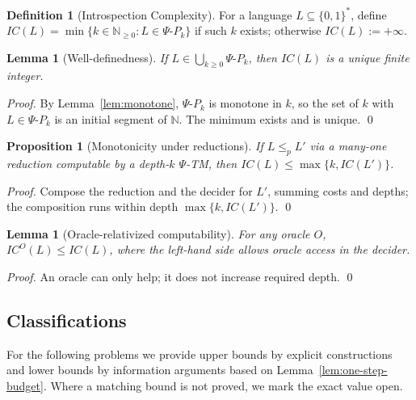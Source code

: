\documentclass[11pt]{article}
\newtheorem{lemma}[theorem]{Lemma}
\newtheorem{proposition}[theorem]{Proposition}
\theoremstyle{definition}
\newtheorem{definition}[theorem]{Definition}
\newcommand{\PSi}{\Psi}
\newcommand{\bits}{\{0,1\}}
\begin{document}
\begin{definition}[Introspection Complexity]
For a language $L\subseteq \bits^*$, define $IC(L)=\min\{k\in\mathbb{N}_{\ge0}: L\in \Psi\text{-}P_k\}$ if such $k$ exists; otherwise $IC(L):=+\infty$.
\end{definition}

\begin{lemma}[Well-definedness]
If $L\in\bigcup_{k\ge0} \Psi\text{-}P_k$, then $IC(L)$ is a unique finite integer.
\end{lemma}
\begin{proof}
By Lemma~\ref{lem:monotone}, $\Psi\text{-}P_k$ is monotone in $k$, so the set of $k$ with $L\in\Psi\text{-}P_k$ is an initial segment of $\mathbb{N}$. The minimum exists and is unique. \qed
\end{proof}

\begin{proposition}[Monotonicity under reductions]
If $L\le_p L'$ via a many-one reduction computable by a depth-$k$ $\PSi$-TM, then $IC(L)\le \max\{k, IC(L')\}$.
\end{proposition}
\begin{proof}
Compose the reduction and the decider for $L'$, summing costs and depths; the composition runs within depth $\max\{k,IC(L')\}$. \qed
\end{proof}

\begin{lemma}[Oracle-relativized computability]
For any oracle $O$, $IC^{O}(L)\le IC(L)$, where the left-hand side allows oracle access in the decider.
\end{lemma}
\begin{proof}
An oracle can only help; it does not increase required depth. \qed
\end{proof}

\subsection{Classifications}

For the following problems we provide upper bounds by explicit constructions and lower bounds by information arguments based on Lemma~\ref{lem:one-step-budget}. Where a matching bound is not proved, we mark the exact value open.
\end{document}
